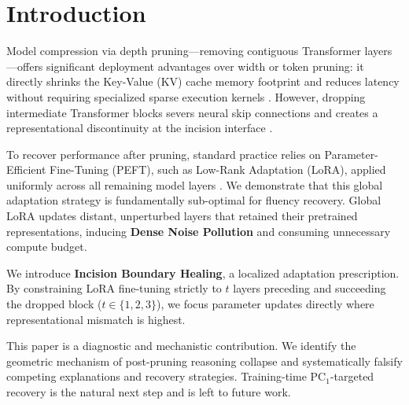 \documentclass[11pt]{article}
\begin{document}
\section{Introduction}

Model compression via depth pruning---removing contiguous Transformer \citep{vaswani2017attention} layers---offers significant deployment advantages over width or token pruning: it directly shrinks the Key-Value (KV) cache memory footprint and reduces latency without requiring specialized sparse execution kernels \citep{gromov2024unreasonable,siddiqui2024deeper,men-etal-2025-shortgpt}. However, dropping intermediate Transformer blocks severs neural skip connections and creates a representational discontinuity at the incision interface \citep{kim2024shortened,sheth2026cap}.

To recover performance after pruning, standard practice relies on Parameter-Efficient Fine-Tuning (PEFT), such as Low-Rank Adaptation (LoRA), applied uniformly across all remaining model layers \citep{hu2022lora,ma2023llmpruner}. We demonstrate that this global adaptation strategy is fundamentally sub-optimal for fluency recovery. Global LoRA updates distant, unperturbed layers that retained their pretrained representations, inducing \textbf{Dense Noise Pollution} and consuming unnecessary compute budget.

We introduce \textbf{Incision Boundary Healing}, a localized adaptation prescription. By constraining LoRA fine-tuning strictly to $t$ layers preceding and succeeding the dropped block ($t \in \{1, 2, 3\}$), we focus parameter updates directly where representational mismatch is highest.

This paper is a diagnostic and mechanistic contribution. We identify the geometric mechanism of post-pruning reasoning collapse and systematically falsify competing explanations and recovery strategies. Training-time PC$_1$-targeted recovery is the natural next step and is left to future work.
\end{document}
